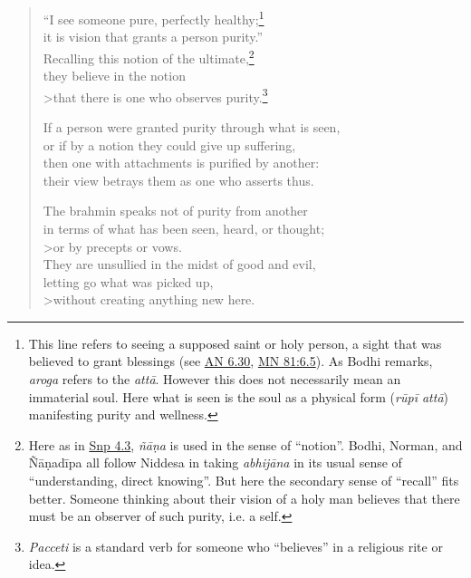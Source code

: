 \documentclass[12pt,openany]{book}%
\begin{document}
\begin{verse}%
“I see someone pure, perfectly healthy;\footnote{This line refers to seeing a supposed saint or holy person, a sight that was believed to grant blessings (see \href{https://suttacentral.net/an6.30/en/sujato}{AN 6.30}, \href{https://suttacentral.net/mn81/en/sujato\#6.5}{MN 81:6.5}). As Bodhi remarks, \textit{aroga} refers to the \textit{\textsanskrit{attā}}. However this does not necessarily mean an immaterial soul. Here what is seen is the soul as a physical form (\textit{\textsanskrit{rūpī} \textsanskrit{attā}}) manifesting purity and wellness. } \\
it is vision that grants a person purity.” \\
Recalling this notion of the ultimate,\footnote{Here as in \href{https://suttacentral.net/snp4.3/en/sujato}{Snp 4.3}, \textit{\textsanskrit{ñāṇa}} is used in the sense of “notion”. Bodhi, Norman, and \textsanskrit{Ñāṇadīpa} all follow Niddesa in taking \textit{\textsanskrit{abhijāna}} in its usual sense of “understanding, direct knowing”. But here the secondary sense of “recall” fits better. Someone thinking about their vision of a holy man believes that there must be an observer of such purity, i.e. a self. } \\
they believe in the notion \\>that there is one who observes purity.\footnote{\textit{Pacceti} is a standard verb for someone who “believes” in a religious rite or idea. } 

If a person were granted purity through what is seen, \\
or if by a notion they could give up suffering, \\
then one with attachments is purified by another: \\
their view betrays them as one who asserts thus. 

The brahmin speaks not of purity from another \\
in terms of what has been seen, heard, or thought; \\>or by precepts or vows. \\
They are unsullied in the midst of good and evil, \\
letting go what was picked up, \\>without creating anything new here. 


\end{verse}
\end{document}
